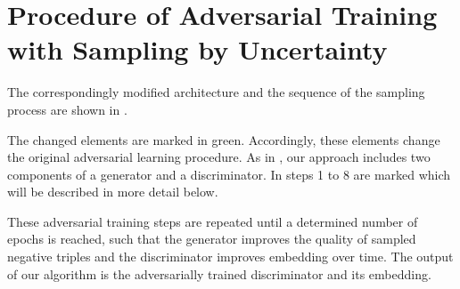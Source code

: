 \section{Procedure of Adversarial Training with Sampling by Uncertainty}
\label{sec:procedure}
%
The correspondingly modified architecture and the sequence of the sampling process are shown in .

The changed elements are marked in green.
Accordingly, these elements change the original adversarial learning procedure.
As in \kbgan, our approach includes two components of a generator and a discriminator.
In  steps 1 to 8 are marked which will be described in more detail below.

















These adversarial training steps are repeated until a determined number of epochs is reached, such that the generator improves the quality of sampled negative triples and the discriminator improves embedding over time.
The output of our algorithm is the adversarially trained discriminator and its embedding.